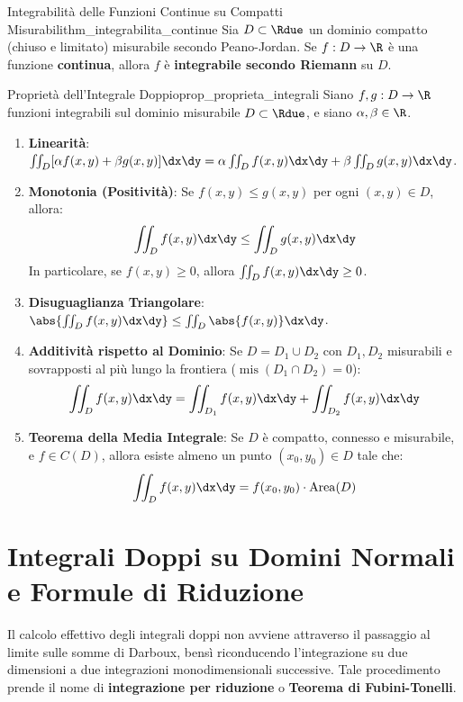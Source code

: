 \begin{teorema}{Integrabilità delle Funzioni Continue su Compatti Misurabili}{thm_integrabilita_continue}
Sia $D \subset \Rdue$ un dominio compatto (chiuso e limitato) misurabile secondo Peano-Jordan.
Se $f: D \to \R$ è una funzione \textbf{continua}, allora $f$ è \textbf{integrabile secondo Riemann} su $D$.
\end{teorema}

\begin{proposizione}{Proprietà dell'Integrale Doppio}{prop_proprieta_integrali}
Siano $f, g: D \to \R$ funzioni integrabili sul dominio misurabile $D \subset \Rdue$, e siano $\alpha, \beta \in \R$.
\begin{enumerate}
    \item \textbf{Linearità}: $\iint_D [\alpha f(x,y) + \beta g(x,y)] \dx\dy = \alpha \iint_D f(x,y) \dx\dy + \beta \iint_D g(x,y) \dx\dy$.
    \item \textbf{Monotonia (Positività)}: Se $f(x,y) \le g(x,y)$ per ogni $(x,y) \in D$, allora:
    \[
    \iint_D f(x,y) \dx\dy \le \iint_D g(x,y) \dx\dy
    \]
    In particolare, se $f(x,y) \ge 0$, allora $\iint_D f(x,y) \dx\dy \ge 0$.
    \item \textbf{Disuguaglianza Triangolare}: $\abs{\iint_D f(x,y) \dx\dy} \le \iint_D \abs{f(x,y)} \dx\dy$.
    \item \textbf{Additività rispetto al Dominio}: Se $D = D_1 \cup D_2$ con $D_1, D_2$ misurabili e sovrapposti al più lungo la frontiera ($\operatorname{mis}(D_1 \cap D_2) = 0$):
    \[
    \iint_D f(x,y) \dx\dy = \iint_{D_1} f(x,y) \dx\dy + \iint_{D_2} f(x,y) \dx\dy
    \]
    \item \textbf{Teorema della Media Integrale}: Se $D$ è compatto, connesso e misurabile, e $f \in C(D)$, allora esiste almeno un punto $(x_0, y_0) \in D$ tale che:
    \[
    \iint_D f(x,y) \dx\dy = f(x_0, y_0) \cdot \operatorname{Area}(D)
    \]
\end{enumerate}
\end{proposizione}

\section{Integrali Doppi su Domini Normali e Formule di Riduzione}

Il calcolo effettivo degli integrali doppi non avviene attraverso il passaggio al limite sulle somme di Darboux, bensì riconducendo l'integrazione su due dimensioni a due integrazioni monodimensionali successive. Tale procedimento prende il nome di \textbf{integrazione per riduzione} o \textbf{Teorema di Fubini-Tonelli}.

